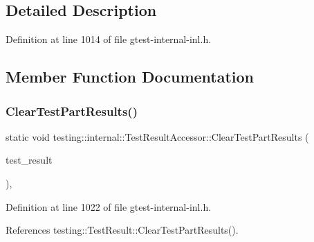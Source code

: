 \subsection{Detailed Description}


Definition at line 1014 of file gtest-\/internal-\/inl.\+h.



\subsection{Member Function Documentation}
\mbox{\label{classtesting_1_1internal_1_1TestResultAccessor_a53c626632bac65d82d88e432072b866b}} 
\subsubsection{\texorpdfstring{Clear\+Test\+Part\+Results()}{ClearTestPartResults()}}
{\footnotesize\ttfamily static void testing\+::internal\+::\+Test\+Result\+Accessor\+::\+Clear\+Test\+Part\+Results (\begin{DoxyParamCaption}\item[{\hyperlink{classtesting_1_1TestResult}{Test\+Result} $\ast$}]{test\+\_\+result }\end{DoxyParamCaption})\hspace{0.3cm}{\ttfamily [inline]}, {\ttfamily [static]}}



Definition at line 1022 of file gtest-\/internal-\/inl.\+h.



References testing\+::\+Test\+Result\+::\+Clear\+Test\+Part\+Results().


